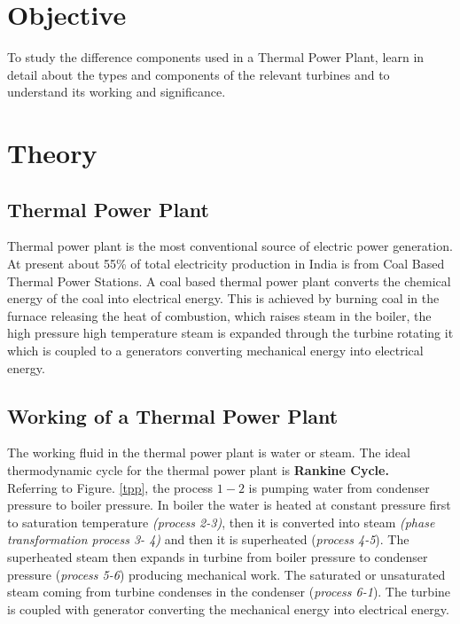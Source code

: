\documentclass[11pt]{article}
\begin{document}
\tableofcontents
\thispagestyle{empty}
\clearpage
\setcounter{page}{1}

\section{Objective}
To study the difference components used in a Thermal Power Plant, learn in detail about the types and components of the relevant turbines and to understand its working and significance. 
\section{Theory}

\subsection{Thermal Power Plant}
Thermal power plant is the most conventional source of electric power generation.\\ At present about 55\% of total electricity production in India is from Coal Based Thermal Power Stations. A coal based thermal power plant converts the chemical energy of the coal into electrical energy. This is achieved by burning coal in the furnace releasing the heat of combustion, which raises steam in the boiler, the high pressure high temperature steam is expanded through the turbine rotating it which is coupled to a generators converting mechanical energy into electrical energy.\\

\subsection{Working of a Thermal Power Plant}

The working fluid in the thermal power plant is water or steam. The ideal thermodynamic cycle for the thermal power plant is \textbf{Rankine Cycle.} \\

Referring to Figure. \ref{tpp}, the process \textit{$ 1-2 $} is pumping water from condenser pressure to boiler pressure. In boiler the water is heated at constant pressure first to saturation temperature \textit{(process 2-3)}, then it is converted into steam \textit{(phase transformation process 3- 4)} and then it is superheated (\textit{process 4-5}). The superheated steam then expands in turbine from boiler pressure to condenser pressure (\textit{process 5-6}) producing mechanical work. The saturated or unsaturated steam coming from turbine condenses in the condenser (\textit{process 6-1}). The turbine is coupled with generator converting the mechanical energy into electrical energy. \\
\end{document}
